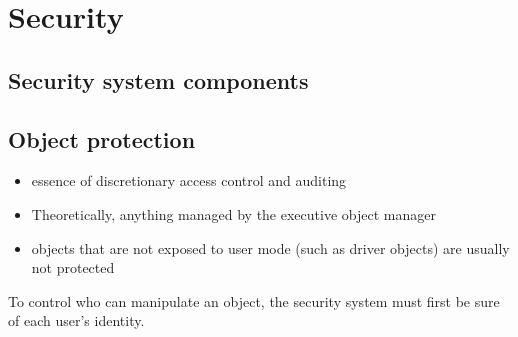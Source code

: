 \section{Security}

\subsection{Security system components}


\subsection{Object protection}
\begin{itemize}
    \item essence of discretionary access control and auditing
    \item Theoretically, anything managed by the executive object manager
    \item objects that are not exposed to user mode (such as driver objects) are usually not protected
    
\end{itemize}

To control who can manipulate an object, the security system must first be sure of each user’s identity.

